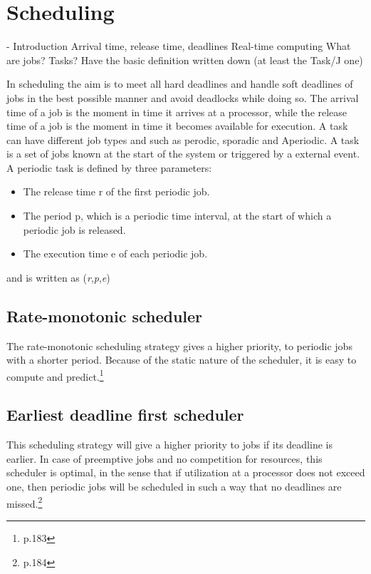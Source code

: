 \section{Scheduling} \label{sc:scheduling}

- Introduction
Arrival time, release time, deadlines
Real-time computing
What are jobs? Tasks?
Have the basic definition written down (at least the Task/J one)


In scheduling the aim is to meet all hard deadlines and handle soft deadlines of jobs in the best possible manner and avoid deadlocks while doing so. The arrival time of a job is the moment in time it arrives at a processor, while the
release time of a job is the moment in time it becomes available for execution. A task can have different job types and such as perodic, sporadic and Aperiodic. A task is a set of jobs known at the start of the system or triggered by a external event.
A periodic task is defined by three parameters:
\begin{itemize}
	\item The release time r of the first periodic job.
	\item The period p, which is a periodic time interval, at the start of which a periodic job is released.
	\item The execution time e of each periodic job.
\end{itemize}
and is written as (\textit{r},\textit{p},\textit{e})

\subsection{Rate-monotonic scheduler}
The rate-monotonic scheduling strategy gives a higher priority, to periodic jobs with a shorter period. Because of the static nature of the scheduler, it is easy to compute and predict.\footnote{\cite{Fokkink1965} p.183}

\subsection{Earliest deadline first scheduler}
This scheduling strategy will give a higher priority to jobs if its deadline is
earlier. In case of preemptive jobs and no competition for resources, this scheduler
is optimal, in the sense that if utilization at a processor does not exceed one, then
periodic jobs will be scheduled in such a way that no deadlines are missed.\footnote{\cite{Fokkink1965} p.184}

